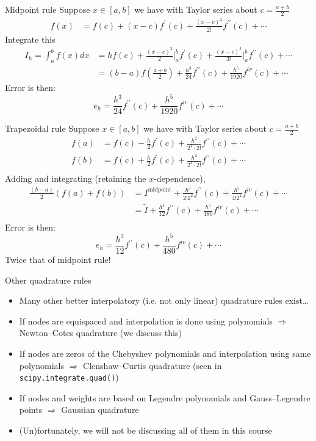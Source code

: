 \documentclass[presentation]{beamer}
\begin{document}
\begin{frame}[label={sec:orge23f000}]{Midpoint rule}
Suppose \(x \in [a,b]\) we have with Taylor series about \(c = \frac{a +
   b}{2}\)
\[ \begin{aligned} f(x) &= f(c) + (x-c) f^\prime(c) +
   \frac{(x-c)^2}{2!}f^{\prime\prime}(c) + \cdots \end{aligned}\]
Integrate this
\[ \begin{aligned} I_{h} = \int_{a}^{b} f(x) dx &= hf(c) + \frac{(x-c)^2}{2} \biggr\rvert_{a}^{b} f^\prime(c) +
   \frac{(x-c)^3}{3!} \biggr\rvert_{a}^{b} f^{\prime\prime}(c) + \cdots \\
   & = (b-a) f \left( \frac{a + b}{2} \right) +
   \frac{h^3}{24}f^{\prime\prime}(c) + \frac{h^5}{1920}f^{iv}(c) + \cdots
   \end{aligned}\]
Error is then:
\[ e_h  = \frac{h^3}{24}f^{\prime\prime}(c) + \frac{h^5}{1920}f^{iv}(c) + \cdots\]
\end{frame}
\begin{frame}[label={sec:orgac0a866}]{Trapezoidal rule}
Suppose \(x \in [a,b]\) we have with Taylor series about \(c = \frac{a +
   b}{2}\)
\[ \begin{aligned} f(a) &= f(c) - \frac{h}{2} f^\prime(c) +
   \frac{h^2}{2^2 \cdot 2!}f^{\prime\prime}(c) + \cdots \\
   f(b) &= f(c) + \frac{h}{2} f^\prime(c) +
   \frac{h^2}{2^2 \cdot 2!}f^{\prime\prime}(c) + \cdots \\
   \end{aligned}\]
Adding and integrating (retaining the \(x\)-dependence),
\[ \begin{aligned}
   \frac{(b-a)}{2} \left( f(a) + f(b) \right) &= I^{\text{midpoint}} +
   \frac{h^3}{2!2^2}f^{\prime\prime}(c) + \frac{h^5}{4!2^4}f^{iv}(c) + \cdots \\
   &= \tilde{I} +  \frac{h^3}{12}f^{\prime\prime}(c) + \frac{h^5}{480}f^{iv}(c) + \cdots \\
   \end{aligned}\]
Error is then:
\[ e_h  = \frac{h^3}{12}f^{\prime\prime}(c) + \frac{h^5}{480}f^{iv}(c) + \cdots\]
\alert{Twice} that of midpoint rule!
\end{frame}
\begin{frame}[label={sec:org457c219},fragile]{Other quadrature rules}
 \begin{itemize}
\item Many other better interpolatory (i.e. not only linear) quadrature rules exist\ldots{}
\item If nodes are equispaced and interpolation is done using polynomials
\(\Rightarrow\) \alert{Newton--Cotes} quadrature (we discuss this)
\item If nodes are zeros of the Chebyshev polynomials and interpolation using
same polynomials
\(\Rightarrow\) \alert{Clenshaw--Curtis} quadrature (seen in \texttt{scipy.integrate.quad()})
\item If nodes and weights are based on Legendre polynomials and Gauss--Legendre
points \(\Rightarrow\) \alert{Gaussian} quadrature
\item (Un)fortunately, we will not be discussing all of them in this course
\end{itemize}
\end{frame}
\end{document}
